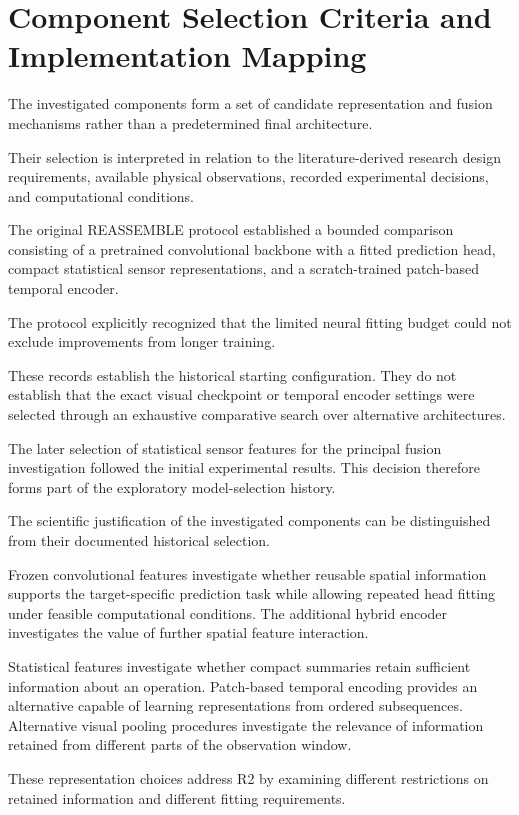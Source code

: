 \section{Component Selection Criteria and Implementation Mapping}

The investigated components form a set of candidate representation and fusion mechanisms rather than a predetermined final architecture.

Their selection is interpreted in relation to the literature-derived research design requirements, available physical observations, recorded experimental decisions, and computational conditions.

The original REASSEMBLE protocol established a bounded comparison consisting of a pretrained convolutional backbone with a fitted prediction head, compact statistical sensor representations, and a scratch-trained patch-based temporal encoder.

The protocol explicitly recognized that the limited neural fitting budget could not exclude improvements from longer training.

These records establish the historical starting configuration. They do not establish that the exact visual checkpoint or temporal encoder settings were selected through an exhaustive comparative search over alternative architectures.

The later selection of statistical sensor features for the principal fusion investigation followed the initial experimental results. This decision therefore forms part of the exploratory model-selection history.

The scientific justification of the investigated components can be distinguished from their documented historical selection.

Frozen convolutional features investigate whether reusable spatial information supports the target-specific prediction task while allowing repeated head fitting under feasible computational conditions. The additional hybrid encoder investigates the value of further spatial feature interaction.

Statistical features investigate whether compact summaries retain sufficient information about an operation. Patch-based temporal encoding provides an alternative capable of learning representations from ordered subsequences. Alternative visual pooling procedures investigate the relevance of information retained from different parts of the observation window.

These representation choices address R2 by examining different restrictions on retained information and different fitting requirements.

